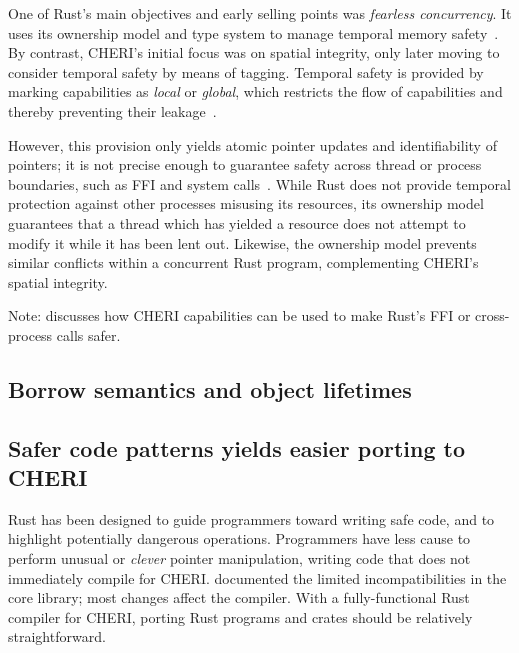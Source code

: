 \documentclass[dissertation.tex]{subfiles}
\begin{document}

One of Rust's main objectives and early selling points was
\emph{fearless concurrency}.
It uses its ownership model and type system to manage temporal memory
safety~\cite{rust-trpl-book}.
By contrast, CHERI's initial focus was on spatial integrity, only later
moving to consider temporal safety by means of tagging.
Temporal safety is provided by marking capabilities as \emph{local} or
\emph{global}, which restricts the flow of capabilities and thereby
preventing their leakage~\cite{cheri2015}.

However, this provision only yields atomic pointer updates and
identifiability of pointers;
it is not precise enough to guarantee safety across thread or process
boundaries, such as FFI and system calls~\cite{cheri-2019-abstract}.
While Rust does not provide temporal protection against other processes
misusing its resources, its ownership model guarantees that a thread
which has yielded a resource does not attempt to modify it while it has
been lent out.
Likewise, the ownership model prevents similar conflicts within a
concurrent Rust program, complementing CHERI's spatial integrity.

Note:  discusses how CHERI capabilities can
be used to make Rust's FFI or cross-process calls safer.


\subsection{Borrow semantics and object lifetimes}


\subsection{Safer code patterns yields easier porting to CHERI}
\label{sec:eval-cheri-port}

Rust has been designed to guide programmers toward writing safe code,
and to highlight potentially dangerous operations.
Programmers have less cause to perform unusual or \emph{clever} pointer
manipulation, writing code that does not immediately compile for CHERI.
 documented the limited incompatibilities in the core
library; most changes affect the compiler.
With a fully-functional Rust compiler for CHERI, porting Rust programs
and crates should be relatively straightforward.
\end{document}
